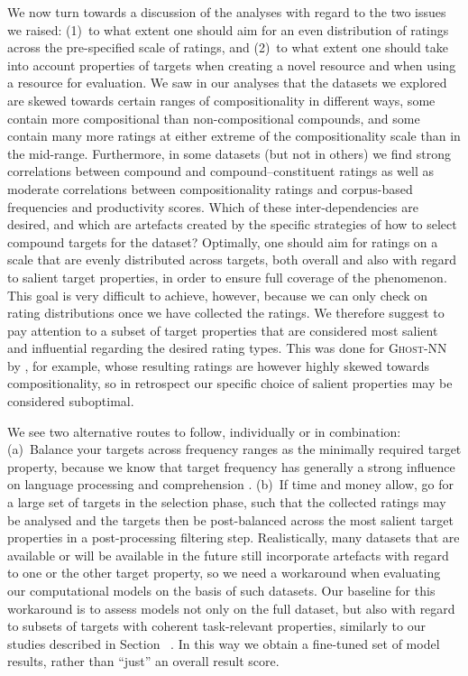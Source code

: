\documentclass[output=paper,colorlinks,citecolor=brown]{langscibook}
\begin{document}
We now turn towards a discussion of the analyses with regard to the two issues we raised: (1)~to what extent one should aim for an even distribution of ratings across the pre-specified scale of ratings, and (2)~to what extent one should take into account properties of targets when creating a novel resource and when using a resource for evaluation. We saw in our analyses that the datasets we explored are skewed towards certain ranges of compositionality in different ways, some contain more compositional than non-compositional compounds, and some contain many more ratings at either extreme of the compositionality scale than in the mid-range. Furthermore, in some datasets (but not in others) we find strong correlations between compound and compound--constituent ratings as well as moderate correlations between compositionality ratings and corpus-based frequencies and productivity scores. Which of these inter-dependencies are desired, and which are artefacts created by the specific strategies of how to select compound targets for the dataset? Optimally, one should aim for ratings on a scale that are evenly distributed across targets, both overall and also with regard to salient target properties, in order to ensure full coverage of the phenomenon. This goal is very difficult to achieve, however, because we can only check on rating distributions once we have collected the ratings. We therefore suggest to pay attention to a subset of target properties that are considered most salient and influential regarding the desired rating types. This was done for \textsc{Ghost-NN} by \citet{SchulteImWaldeEtAl:16b}, for example, whose resulting ratings are however highly skewed towards compositionality, so in retrospect our specific choice of salient properties may be considered suboptimal.

We see two alternative routes to follow, individually or in combination: (a)~Balance your targets across frequency ranges as the minimally required target property, because we know that target frequency has generally a strong influence on language processing and comprehension \citep{Ellis:02}. (b)~If time and money allow, go for a large set of targets in the selection phase, such that the collected ratings may be analysed and the targets then be post-balanced across the most salient target properties in a post-processing filtering step.
%
Realistically, many datasets that are available or will be available in the future still incorporate artefacts with regard to one or the other target property, so we need a workaround when evaluating our computational models on the basis of such datasets. Our baseline for this workaround is to assess models not only on the full dataset, but also with regard to subsets of targets with coherent task-relevant properties, similarly to our studies described in Section~ \citep{SchulteImWaldeEtAl:16b, Koeper/SchulteImWalde:17b, Alipoor/SchulteImWalde:20, Miletic/SchulteImWalde:23}. In this way we obtain a fine-tuned set of model results, rather than ``just'' an overall result score.
\end{document}
